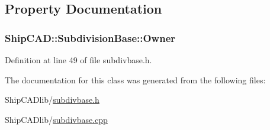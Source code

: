 \subsection{Property Documentation}
\hypertarget{classShipCAD_1_1SubdivisionBase_aa18f308b1a32286b3d29adcd6cb39ebf}{
\subsubsection[{Owner}]{ Ship\-C\-A\-D\-::\-Subdivision\-Base\-::\-Owner\hspace{0.3cm}{\ttfamily [read]}}}\label{classShipCAD_1_1SubdivisionBase_aa18f308b1a32286b3d29adcd6cb39ebf}


Definition at line 49 of file subdivbase.\-h.



The documentation for this class was generated from the following files\-:\begin{DoxyCompactItemize}
\item 
Ship\-C\-A\-Dlib/\hyperlink{subdivbase_8h}{subdivbase.\-h}\item 
Ship\-C\-A\-Dlib/\hyperlink{subdivbase_8cpp}{subdivbase.\-cpp}\end{DoxyCompactItemize}

